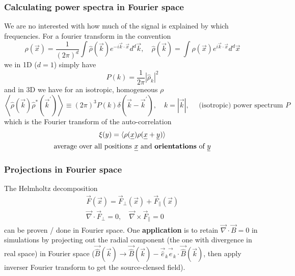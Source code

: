 \subsubsection*{Calculating power spectra in Fourier space}
We are no interested with how much of the signal is explained by 
which frequencies. For a fourier transform in the convention
\begin{equation}
    \rho(\vec{x})=\frac{1}{(2 \pi)^d} \int \hat{\rho}(\vec{k}) e^{-i \vec{k} \cdot \vec{x}} d^d \vec{k}, \quad \hat{\rho}(\vec{k})=\int \rho(\vec{x}) e^{i \vec{k} \cdot \vec{x}} d^d \vec{x}
\end{equation}
we in 1D ($d = 1$) simply have
\begin{equation}
    P(k) = \frac{1}{2\pi} |\hat{\rho}_k|^2
\end{equation}
and in 3D we have for an isotropic, homogeneous $\rho$
\begin{equation}
    \left\langle\hat{\rho}(\vec{k}) \hat{\rho}^*\left(\vec{k}^{\prime}\right)\right\rangle \equiv(2 \pi)^3 P(k) \delta\left(\vec{k}-\vec{k}^{\prime}\right), \quad k=|\vec{k}|, \quad \text { (isotropic) power spectrum } P
\end{equation}
which is the Fourier transform of the auto-correlation
\begin{equation}
    \begin{gathered}
        \xi(y)=\langle\rho(\vec{x}) \rho(\vec{x}+\vec{y})\rangle \\
        \text{average over all positions } \vec{x} \text{ and \textbf{orientations} of } \vec{y}
    \end{gathered}
\end{equation}

\subsubsection*{Projections in Fourier space}
The Helmholtz decomposition
\begin{equation}
    \begin{gathered}
        \vec{F}(\vec{x}) = \vec{F}_\perp(\vec{x}) + \vec{F}_\parallel(\vec{x}) \\
        \vec{\nabla} \cdot \vec{F}_\perp = 0, \quad \vec{\nabla} \times \vec{F}_\parallel = 0
    \end{gathered}
\end{equation}
can be proven / done in Fourier space. One \textbf{application} is to retain 
$\vec{\nabla} \cdot \vec{B} = 0$ in simulations by projecting out the radial 
component (the one with divergence in real space) in Fourier 
space ($\vec{\hat{B}}(\vec{k}) \rightarrow \vec{\hat{B}}(\vec{k}) - \vec{\hat{e}}_k \vec{\hat{e}}_k  \cdot \vec{\hat{B}}(\vec{k})$, 
then apply inverser Fourier transform to get the source-clensed field).

